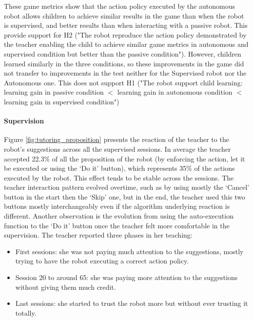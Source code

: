 These game metrics show that the action policy executed by the autonomous robot allows children to achieve similar results in the game than when the robot is supervised, and better results than when interacting with a passive robot. This provide support for H2 ("The robot reproduce the action policy demonstrated by the teacher enabling the child to achieve similar game metrics in autonomous and supervised condition but better than the passive condition"). However, children learned similarly in the three conditions, so these improvements in the game did not transfer to improvements in the test neither for the Supervised robot nor the Autonomous one. This does not support H1 ("The robot support child learning: learning gain in passive condition $<$ learning gain in autonomous condition $<$ learning gain in supervised condition")

\paragraph{Supervision}

Figure \ref{fig:tutoring_proposition} presents the reaction of the teacher to the robot's suggestions across all the supervised sessions. In average the teacher accepted 22.3\% of all the proposition of the robot (by enforcing the action, let it be executed or using the `Do it' button), which represents 35\% of the actions executed by the robot. This effect tends to be stable across the sessions. The teacher interaction pattern evolved overtime, such as by using mostly the `Cancel' button in the start then the `Skip' one, but in the end, the teacher used this two buttons mostly interchangeably even if the algorithm underlying reaction is different. Another observation is the evolution from using the auto-execution function to the `Do it' button once the teacher felt more comfortable in the supervision. The teacher reported three phases in her teaching: 

\begin{itemize}
	\item First sessions: she was not paying much attention to the suggestions, mostly trying to have the robot executing a correct action policy.
	\item Session 20 to around 65: she was paying more attention to the suggestions without giving them much credit.
	\item Last sessions: she started to trust the robot more but without ever trusting it totally.
\end{itemize}

